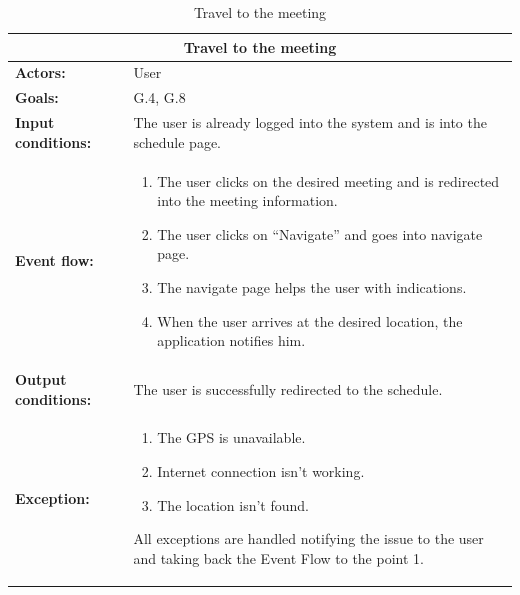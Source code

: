 \begin{table}
\begin{tabular} { p{5cm} p{8cm} }  
\multicolumn{2}{c}{\textbf{Travel to the meeting}}\\
\hline
\textbf{Actors:} & User \\ 
\textbf{Goals:} & G.4, G.8 \\ 
\textbf{Input conditions:} & The user is already logged into the system and is into the schedule page. \\
\textbf{Event flow:} & \begin{enumerate}
				\item
				The user clicks on the desired meeting and is redirected into the meeting information.
				\item
				The user clicks on “Navigate” and goes into navigate page.
				\item
				The navigate page helps the user with indications.
				\item
				When the user arrives at the desired location, the application notifies him.
			\end{enumerate} \\ 
\textbf{Output conditions:} & The user is successfully redirected to the
schedule.\\ 
\textbf{Exception:} & \begin{enumerate}
				\item
				The GPS is unavailable.
				\item
				Internet connection isn't working.				
				\item
				The location isn’t found. 
			\end{enumerate}
All exceptions are handled notifying the issue to the user and taking back the Event Flow to the point 1. \\
\hline
\end{tabular}
\caption{Travel to the meeting}
\label{ref:traveltothemeeting}
\end{table}
\clearpage

